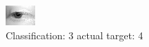 \begin{figure}[h!]
\begin{center}
\includegraphics[width=0.60\columnwidth]{figures/ID2609_class_3_target_4.png}
\end{center}
\caption{ Classification: 3 actual target: 4}
\label{fig:ID2609_class_3_target_4}
\end{figure}
